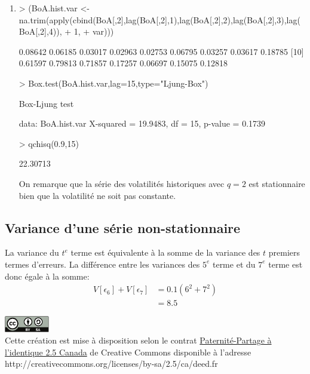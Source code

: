 \documentclass{article}
\begin{document}
\begin{enumerate}
\item
\begin{Schunk}
\begin{Sinput}
> (BoA.hist.var <- na.trim(apply(cbind(BoA[,2],lag(BoA[,2],1),lag(BoA[,2],2),lag(BoA[,2],3),lag(BoA[,2],4)),
+       1,
+       var)))
\end{Sinput}
\begin{Soutput}
 [1] 0.08642 0.06185 0.03017 0.02963 0.02753 0.06795 0.03257 0.03617 0.18785
[10] 0.61597 0.79813 0.71857 0.17257 0.06697 0.15075 0.12818
\end{Soutput}
\begin{Sinput}
> Box.test(BoA.hist.var,lag=15,type="Ljung-Box")
\end{Sinput}
\begin{Soutput}
	Box-Ljung test

data:  BoA.hist.var 
X-squared = 19.9483, df = 15, p-value = 0.1739
\end{Soutput}
\begin{Sinput}
> qchisq(0.9,15)
\end{Sinput}
\begin{Soutput}
[1] 22.30713
\end{Soutput}
\end{Schunk}

On remarque que la série des volatilités historiques avec $q=2$ est stationnaire bien que la volatilité ne soit pas constante.
  
\end{enumerate}

\clearpage
\subsection{Variance d'une série non-stationnaire}

La variance du $t^e$ terme est équivalente à la somme de la variance des $t$ premiers termes d'erreurs. La différence entre les variances des $5^e$ terme et du $7^e$ terme est donc égale à la somme:
\begin{align*}
  \label{eq:2}
  V\left[\epsilon_6\right]+V\left[\epsilon_7\right] &= 0.1(6^2+7^2) \\
  & = 8.5
\end{align*}


\clearpage

\includegraphics[height=7mm,keepaspectratio=true]{by-sa}\\
Cette création est mise à disposition selon le contrat
\href{http://creativecommons.org/licenses/by-sa/2.5/ca/deed.fr}{%
  Paternité-Partage à l'identique 2.5 Canada} de Creative Commons
disponible à l'adresse \\
http://creativecommons.org/licenses/by-sa/2.5/ca/deed.fr \\
\end{document}
